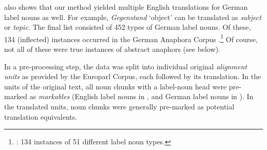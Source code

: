 \documentclass[output=paper]{LSP/langsci}
\begin{document}
\begin{table}
\caption{English label nouns and their German translations} \label{trans_label_nouns}
\end{table}

 also shows that our method yielded multiple English translations for German label nouns as well. For example, \textit{Gegenstand} `object' can be translated as \textit{subject} or \textit{topic}. The final list consisted of 452 types of German label nouns. Of these, 134 (inflected) instances occurred in the German Anaphora Corpus \DEo.\footnote{\DEo: 134 instances of 51 different label noun types.} Of course, not all of these were true instances of abstract anaphors (see below). 


In a pre-processing step, the data was split into individual original \textit{alignment units} as provided by the Europarl Corpus, each followed by its translation. In the units of the original text, all noun chunks with a label-noun head were pre-marked as \textit{markables} (English label nouns in \ENo, and German label nouns in \DEo). In the translated units, noun chunks were generally pre-marked as potential translation equivalents.
\end{document}
